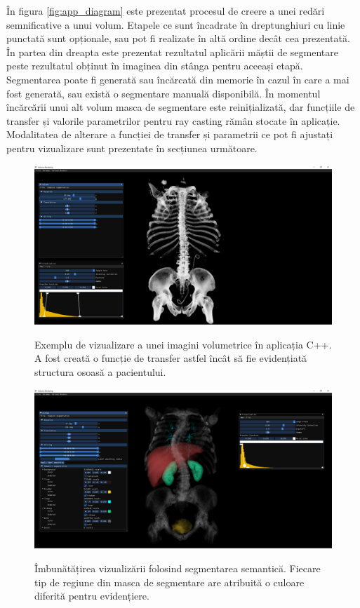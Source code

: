 În figura \ref{fig:app_diagram} este prezentat procesul de creere a unei redări semnificative a unui volum. Etapele ce sunt încadrate în dreptunghiuri cu linie punctată sunt opționale, sau pot fi realizate în altă ordine decât cea prezentată. În partea din dreapta este prezentat rezultatul aplicării măștii de segmentare peste rezultatul obținut în imaginea din stânga pentru aceeași etapă. Segmentarea poate fi generată sau încărcată din memorie în cazul în care a mai fost generată, sau există o segmentare manuală disponibilă. În momentul încărcării unui alt volum masca de segmentare este reinițializată, dar funcțiile de transfer și valorile parametrilor pentru ray casting rămân stocate în aplicație. Modalitatea de alterare a funcției de transfer și parametrii ce pot fi ajustați pentru vizualizare sunt prezentate în secțiunea următoare.


\begin{figure}[!h]
    \centering
    \includegraphics[width=15cm]{images/prt_app.png}
    \\
    \caption{Exemplu de vizualizare a unei imagini volumetrice în aplicația C++. A fost creată o funcție de transfer astfel încât să fie evidențiată structura osoasă a pacientului.}
    \label{fig:viz_volume}
\end{figure}

\begin{figure}[!h]
    \centering
    \includegraphics[width=15cm]{images/prt_app_seg.png}
    \\
    \caption{Îmbunătățirea vizualizării folosind segmentarea semantică. Fiecare tip de regiune din masca de segmentare are atribuită o culoare diferită pentru evidențiere.}
    \label{fig:viz_volume_seg}
\end{figure}

